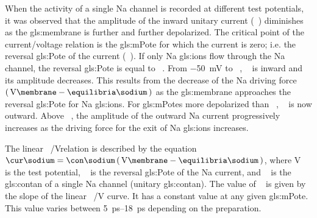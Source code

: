 \documentclass[class={.NoTouch/myProject}, crop=false]{standalone}
\begin{document}
When the activity of a single \gls{Na} channel is  recorded at different test potentials, it was observed that the amplitude of the inward unitary current (\unit{\cur\sodium}) diminishes as the \gls{gls:membrane} is further and further depolarized. The critical point of the current/voltage relation is the \gls{gls:mPote} for which the current is zero; i.e. the reversal \gls{gls:Pote} of the current (\unit{\equilibria\reverse}). If only \gls{Na} \glspl{gls:ion} flow through the \gls{Na} channel, the reversal \gls{gls:Pote} is equal to \unit{\equilibria\sodium}. From \qty{-50}{\mV} to \unit{\equilibria\reverse}, \unit{\cur\sodium} is inward and its amplitude decreases. This results from the decrease of the \gls{Na} driving force \(\br{\unit{\V\membrane}-\unit{\equilibria\sodium}}\) as the \gls{gls:membrane} approaches the reversal \gls{gls:Pote} for \gls{Na} \glspl{gls:ion}. For \glspl{gls:mPote} more depolarized than \unit{\equilibria\reverse}, \unit{\cur\sodium} is now outward. Above \unit{\equilibria\reverse}, the amplitude of the outward \gls{Na} current progressively increases as the driving force for the exit of \gls{Na} \glspl{gls:ion} increases. 

The linear \unit[per-mode = symbol]{\cur\sodium\per\V}relation is described by the equation \(\unit{\cur\sodium} = \unit{\con\sodium} \br{\unit{\V\membrane}-\unit{\equilibria\sodium}}\), where \unit{\V\membrane} is the test potential, \unit{\equilibria\sodium} is the reversal \gls{gls:Pote} of the \gls{Na} current, and \unit{\con\sodium} is the \gls{gls:contan} of a single \gls{Na} channel (unitary \gls{gls:contan}). The value of \unit{\con\sodium} is given by the slope of the linear \unit[per-mode = symbol]{\cur\sodium\per\V} curve. It has a constant value at any given \gls{gls:mPote}. This value varies between \qtyrange{5}{18}{\pico\second} depending on the preparation.
\end{document}
